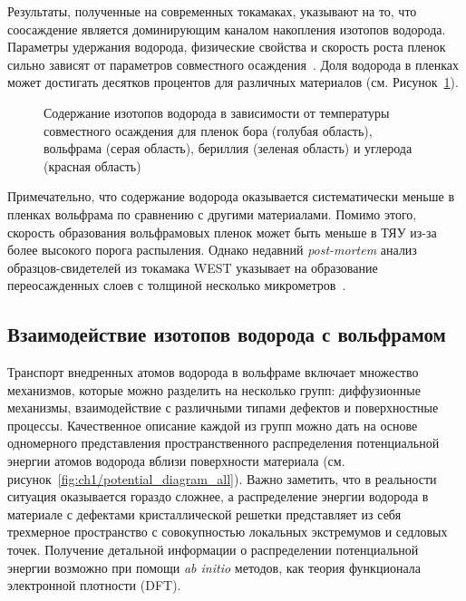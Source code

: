 Результаты, полученные на современных токамаках, указывают на то, что соосаждение является доминирующим каналом накопления изотопов водорода. Параметры удержания водорода, физические свойства и скорость роста пленок сильно зависят от параметров совместного осаждения~\cite{Gasparyan2019,Krat2020,Krat2025}. Доля водорода в пленках может достигать десятков процентов для различных материалов (см. Рисунок~\cref{fig:ch1/codeposition_review}).
\begin{figure}[ht]
    \caption{Содержание изотопов водорода в зависимости от температуры совместного осаждения для пленок бора (голубая область), вольфрама (серая область), бериллия (зеленая область) и углерода (красная область)~\cite{Pitts2025}}\label{fig:ch1/codeposition_review}
\end{figure}
Примечательно, что содержание водорода оказывается систематически меньше в пленках вольфрама по сравнению с другими материалами. Помимо этого, скорость образования вольфрамовых пленок может быть меньше в ТЯУ из-за более высокого порога распыления. Однако недавний \textit{post-mortem} анализ образцов-свидетелей из токамака WEST указывает на образование переосажденных слоев с толщиной несколько микрометров~\cite{Bucalossi2024}.

\subsection{Взаимодействие изотопов водорода с вольфрамом}

Транспорт внедренных атомов водорода в вольфраме включает множество механизмов, которые можно разделить на несколько групп: диффузионные механизмы, взаимодействие с различными типами дефектов и поверхностные процессы. Качественное описание каждой из групп можно дать на основе одномерного представления пространственного распределения потенциальной энергии атомов водорода вблизи поверхности материала (см. рисунок~\cref{fig:ch1/potential_diagram_all}). Важно заметить, что в реальности ситуация оказывается гораздо сложнее, а распределение энергии водорода в материале с дефектами кристаллической решетки представляет из себя трехмерное пространство с совокупностью локальных экстремумов и седловых точек. Получение детальной информации о распределении потенциальной энергии возможно при помощи \textit{ab initio} методов, как теория функционала электронной плотности (DFT).


